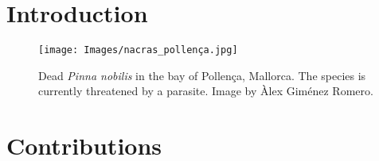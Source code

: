 \section{Introduction}

\begin{figure}
    \centering
    \texttt{[image: Images/nacras\_pollença.jpg]}
    \caption{Dead \textit{Pinna nobilis} in the bay of Pollença, Mallorca. The
        species is currently threatened by a parasite. Image by Àlex Giménez
        Romero.}
    \label{fig:nacras_pollença}
\end{figure}


\section{Contributions}